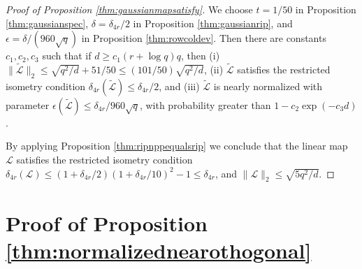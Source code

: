 \documentclass[11pt,letterpaper]{article}
\begin{document}
\begin{proof}[Proof of Proposition \ref{thm:gaussianmapsatisfy}]
	We choose $t = 1/50$ in Proposition \ref{thm:gaussianspec}, $\delta = \delta_{4r}/2$ in Proposition \ref{thm:gaussianrip}, and $\epsilon = \delta / (960\sqrt{q})$ in Proposition \ref{thm:rowcoldev}.  Then there are constants $c_1, c_2, c_3$ such that if $d \geq c_1 (r + \log q) q$, then (i) $\|\tilde{\mathcal{L}}\|_2\leq \sqrt{q^2/d}+ 51/50 \leq (101/50) \sqrt{q^2/d}$, (ii) $\tilde{\mathcal{L}}$ satisfies the restricted isometry condition $\delta_{4r}(\tilde{\mathcal{L}}) \leq \delta_{4r}/2$, and (iii) $\tilde{\mathcal{L}}$ is nearly normalized with parameter $\epsilon(\tilde{\mathcal{L}}) \leq \delta_{4r}/ 960 \sqrt{q}$, with probability greater than $1 - c_2 \exp( - c_3 d)$.
	
	By applying Proposition \ref{thm:ripnppequalsrip} we conclude that the linear map $\mathcal{L}$ satisfies the restricted isometry condition $\delta_{4r}(\mathcal{L})\leq (1+\delta_{4r}/2) (1 + \delta_{4r}/10)^2 -1 \leq \delta_{4r}$, and $\|\mathcal{L} \|_2 \leq \sqrt{5q^2/d}$.
\end{proof}


\section{Proof of Proposition \ref{thm:normalizednearothogonal}}
\end{document}

